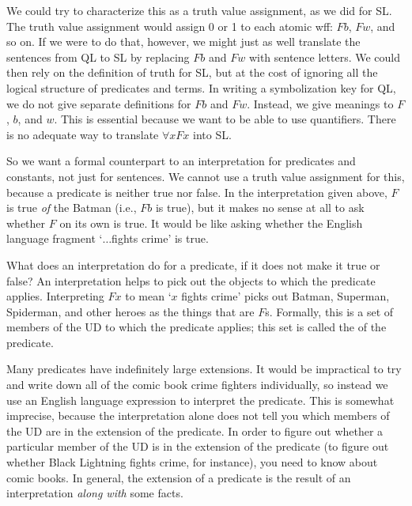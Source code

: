 

We could try to characterize this as a truth value assignment, as we did for SL. The truth value assignment would assign 0 or 1 to each atomic wff: $Fb$, $Fw$, and so on. If we were to do that, however, we might just as well translate the sentences from QL to SL by replacing $Fb$ and $Fw$ with sentence letters. We could then rely on the definition of truth for SL, but at the cost of ignoring all the logical structure of predicates and terms. In writing a symbolization key for QL, we do not give separate definitions for $Fb$ and $Fw$. Instead, we give meanings to $F$, $b$, and $w$. This is essential because we want to be able to use quantifiers. There is no adequate way to translate $\forall x Fx$ into SL.

So we want a formal counterpart to an interpretation for predicates and constants, not just for sentences. We cannot use a truth value assignment for this, because a predicate is neither true nor false. In the interpretation given above, $F$ is true \emph{of} the Batman (i.e., $Fb$ is true), but it makes no sense at all to ask whether $F$ on its own is true. It would be like asking whether the English language fragment `$\ldots$fights crime' is true.

What does an interpretation do for a predicate, if it does not make it true or false? An interpretation helps to pick out the objects to which the predicate applies. Interpreting $Fx$ to mean `$x$ fights crime' picks out Batman, Superman, Spiderman, and other heroes as the things that are $F$s. Formally, this is a set of members of the UD to which the predicate applies; this set is called the  of the predicate.

Many predicates have indefinitely large extensions. It would be impractical to try and write down all of the comic book crime fighters individually, so instead we use an English language expression to interpret the predicate. This is somewhat imprecise, because the interpretation alone does not tell you which members of the UD are in the extension of the predicate. In order to figure out whether a particular member of the UD is in the extension of the predicate (to figure out whether Black Lightning fights crime, for instance), you need to know about comic books. In general, the extension of a predicate is the result of an interpretation \emph{along with} some facts.


